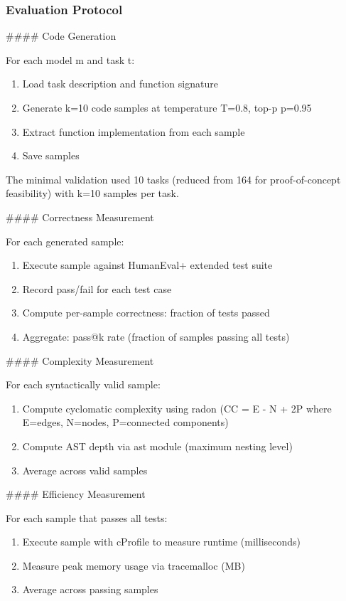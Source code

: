 \subsubsection{Evaluation Protocol}

\#\#\#\# Code Generation

For each model m and task t:

\begin{enumerate}
\item Load task description and function signature
\item Generate k=10 code samples at temperature T=0.8, top-p p=0.95
\item Extract function implementation from each sample
\item Save samples
\end{enumerate}

The minimal validation used 10 tasks (reduced from 164 for proof-of-concept feasibility) with k=10 samples per task.

\#\#\#\# Correctness Measurement

For each generated sample:

\begin{enumerate}
\item Execute sample against HumanEval+ extended test suite
\item Record pass/fail for each test case
\item Compute per-sample correctness: fraction of tests passed
\item Aggregate: pass@k rate (fraction of samples passing all tests)
\end{enumerate}

\#\#\#\# Complexity Measurement

For each syntactically valid sample:

\begin{enumerate}
\item Compute cyclomatic complexity using radon (CC = E - N + 2P where E=edges, N=nodes, P=connected components)
\item Compute AST depth via ast module (maximum nesting level)
\item Average across valid samples
\end{enumerate}

\#\#\#\# Efficiency Measurement

For each sample that passes all tests:

\begin{enumerate}
\item Execute sample with cProfile to measure runtime (milliseconds)
\item Measure peak memory usage via tracemalloc (MB)
\item Average across passing samples
\end{enumerate}

